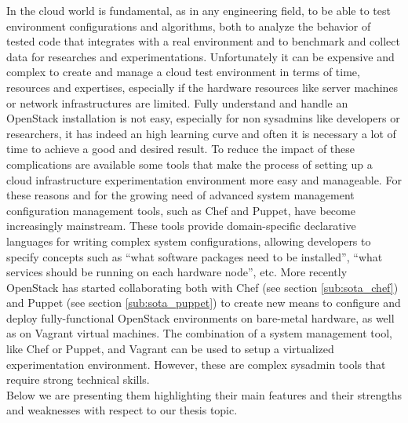 In the cloud world is fundamental, as in any engineering field, to be able to test environment configurations and algorithms, both to analyze the behavior of tested code that integrates with a real environment and to benchmark and collect data for researches and experimentations. Unfortunately it can be expensive and complex to create and manage a cloud test environment in terms of time, resources and expertises, especially if the hardware resources like server machines or network infrastructures are limited. Fully understand and handle an OpenStack installation is not easy, especially for non sysadmins  like developers or researchers, it has indeed an high learning curve and often it is necessary a lot of time to achieve a good and desired result.
To reduce the impact of these complications are available some tools that make the process of setting up a cloud infrastructure experimentation environment more easy and manageable.
For these reasons and for the growing need of advanced system management configuration management tools, such as Chef and Puppet, have become increasingly mainstream. These tools provide domain-specific declarative languages for writing complex system configurations, allowing developers to specify concepts such as ``what software packages need to be installed'', ``what services should be running on each hardware node'', etc. More recently OpenStack has started collaborating both with Chef (see section \ref{sub:sota_chef}) and Puppet (see section \ref{sub:sota_puppet}) to create new means to configure and deploy fully-functional OpenStack environments on bare-metal hardware, as well as on Vagrant virtual machines. The combination of a system management tool, like Chef or Puppet, and Vagrant can be used to setup a virtualized experimentation environment. However, these are complex sysadmin tools that require strong technical skills.\\
Below we are presenting them highlighting their main features and their strengths and weaknesses with respect to our thesis topic.

